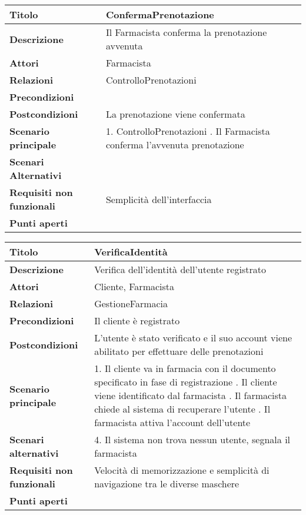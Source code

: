\begin{tabular} {|P{4.5cm}|P{12.5cm}|}
\hline
  \textbf{Titolo} & ConfermaPrenotazione\\
\hline
  \textbf{Descrizione} & Il Farmacista conferma la prenotazione avvenuta\\
\hline
  \textbf{Attori} & Farmacista\\
\hline
  \textbf{Relazioni} & ControlloPrenotazioni\\
\hline
  \textbf{Precondizioni} &\\
\hline
  \textbf{Postcondizioni} & La prenotazione viene confermata\\
\hline
  \textbf{Scenario principale} & 1. ControlloPrenotazioni . Il Farmacista conferma l'avvenuta prenotazione\\
\hline
  \textbf{Scenari Alternativi} & \\
\hline
  \textbf{Requisiti non funzionali} & Semplicità dell'interfaccia\\
\hline
  \textbf{Punti aperti} &\\
\hline
\end{tabular}
\hfill
\break

\begin{tabular} {|P{4.5cm}|P{12.5cm}|}
  \hline
    \textbf{Titolo} & VerificaIdentità\\
  \hline
    \textbf{Descrizione} & Verifica dell'identità dell'utente registrato\\
  \hline
    \textbf{Attori} & Cliente, Farmacista\\
  \hline
    \textbf{Relazioni} & GestioneFarmacia\\
  \hline
    \textbf{Precondizioni} & Il cliente è registrato\\
  \hline
    \textbf{Postcondizioni} & L'utente è stato verificato e il suo account viene abilitato per effettuare delle prenotazioni\\
  \hline
    \textbf{Scenario principale} & 1. Il cliente va in farmacia con il documento specificato in fase di registrazione . Il cliente viene identificato dal farmacista . Il farmacista chiede al sistema di recuperare l'utente . Il farmacista attiva l'account dell'utente\\
  \hline
    \textbf{Scenari alternativi} & 4. Il sistema non trova nessun utente, segnala il farmacista\\
  \hline
  \textbf{Requisiti non funzionali} & Velocità di memorizzazione e semplicità di navigazione tra le diverse maschere\\
  \hline
    \textbf{Punti aperti} &\\
  \hline
\end{tabular}
\hfill
\break

